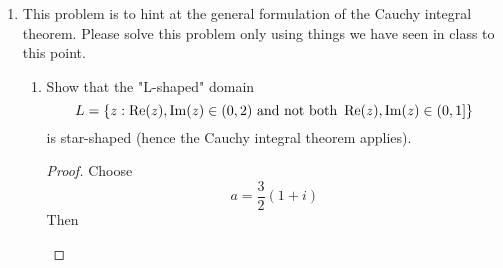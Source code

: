 \documentclass[../psets.tex]{subfiles}
\begin{document}
\begin{enumerate}[label={\textbf{\arabic*.}}]
\begin{enumerate}
\begin{proof}
\begin{equation*}
            \end{equation*}
        \end{proof}
        \item Suppose that 
        \begin{equation*}
            f(z) = \frac{1}{z(z-1)(z-i)(z-1-i)}
        \end{equation*}
        Find the unique point $w$ in the unit square $\{\re(z),\im(z)\in[0,1]\}$ such that the radius of convergence of the power series for $w$ is maximal. Justify your answer.
        \begin{proof}
            The definition of $f$ singles out the four corners of the unit square as singularities. Thus, the disk of convergence cannot include any of these corners, so we need the point in the unit square that's farthest away from all four corners. This would be
            \begin{equation*}
                \boxed{w = \frac{1}{2}(1+i)}
            \end{equation*}
        \end{proof}
    \end{enumerate}
    \item This problem is to hint at the general formulation of the Cauchy integral theorem. Please solve this problem only using things we have seen in class to this point.
    \begin{enumerate}
        \item Show that the "L-shaped" domain
        \begin{equation*}
            L = \{z:\operatorname{Re}(z),\operatorname{Im}(z)\in(0,2)\text{ and not both }\operatorname{Re}(z),\operatorname{Im}(z)\in(0,1]\}
        \end{equation*}
        is star-shaped (hence the Cauchy integral theorem applies).
        \begin{proof}
            Choose
            \begin{equation*}
                a = \frac{3}{2}(1+i)
            \end{equation*}
            Then
            \begin{center}
\end{center}
\end{proof}
\end{enumerate}
\end{enumerate}
\end{document}
